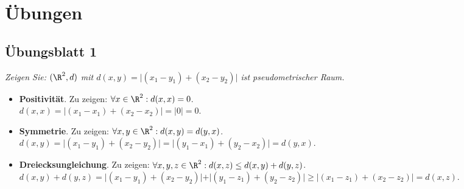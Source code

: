 \chapter{Übungen}



% 
\section{Übungsblatt 1}
\begin{problem*}[1]
  \emph{Zeigen Sie: \( (\R^2, d) \) mit \( d(x,y) = \vert (x_1-y_1)+(x_2-y_2) \vert \) ist pseudometrischer Raum.}
  \begin{itemize}
    \item \textbf{Positivität}. Zu zeigen: \( \forall x \in \R^2: d(x,x) = 0 \). \\
    \( d(x,x) = \vert (x_1-x_1)+(x_2-x_2) \vert = \vert 0 \vert = 0 \).
    \item \textbf{Symmetrie}. Zu zeigen: \( \forall x, y \in \R^2: d(x,y) = d(y,x) \). \\
    \( d(x,y) = \vert (x_1-y_1)+(x_2-y_2) \vert = \vert (y_1-x_1)+(y_2-x_2) \vert = d(y,x) \).
    \item \textbf{Dreiecksungleichung}. Zu zeigen: \( \forall x,y,z \in \R^2: d(x,z) \leq d(x,y) + d(y,z) \). \\
    \( d(x,y) + d(y,z) = \vert (x_1-y_1)+(x_2-y_2) \vert + \vert (y_1-z_1)+(y_2-z_2) \vert \geq \vert (x_1-z_1) + (x_2 - z_2) \vert = d(x,z) \).
  \end{itemize}
\end{problem*}

